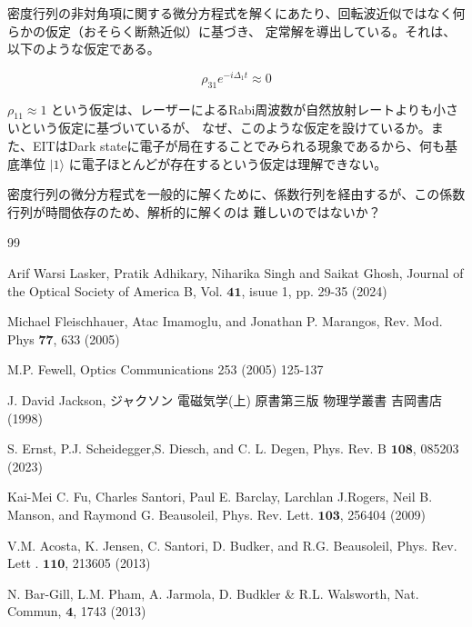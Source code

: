 \documentclass[11pt,a4paper]{ltjsarticle}
\begin{document}
密度行列の非対角項に関する微分方程式を解くにあたり、回転波近似ではなく何らかの仮定（おそらく断熱近似）に基づき、
定常解を導出している。それは、以下のような仮定である。

\begin{equation*}
  \rho_{31} e^{-i \Delta_1 t } \approx 0
\end{equation*}

$\rho_{11} \approx 1$ という仮定は、レーザーによるRabi周波数が自然放射レートよりも小さいという仮定に基づいているが、
なぜ、このような仮定を設けているか。また、EITはDark stateに電子が局在することでみられる現象であるから、何も基底準位 $|1\rangle$
に電子ほとんどが存在するという仮定は理解できない。 

密度行列の微分方程式を一般的に解くために、係数行列を経由するが、この係数行列が時間依存のため、解析的に解くのは
難しいのではないか？



\begin{thebibliography}{99}

Arif Warsi Lasker,
Pratik Adhikary, Niharika Singh and Saikat Ghosh, Journal of the Optical Society of America B, Vol. $\mathbf{41}$, isuue 1, pp. 29-35 (2024)

Michael Fleischhauer, 
Atac Imamoglu, and Jonathan P. Marangos, Rev. Mod. Phys $\mathbf{77}$, 633 (2005)

M.P. Fewell, 
Optics Communications 253 (2005) 125-137


J. David Jackson,
ジャクソン 電磁気学(上) 原書第三版 物理学叢書 吉岡書店 (1998)

S. Ernst,
P.J. Scheidegger,S. Diesch, and C. L. Degen, Phys. Rev. B $\mathbf{108}$, 085203 (2023)

Kai-Mei C. Fu, Charles Santori, Paul E. Barclay, Larchlan J.Rogers, Neil B. Manson, and Raymond G. Beausoleil, 
Phys. Rev. Lett. $\mathbf{103}$, 256404 (2009)

V.M. Acosta, K. Jensen, C. Santori, D. Budker, and R.G. Beausoleil, 
Phys. Rev. Lett . $\mathbf{110}$, 213605 (2013)

N. Bar-Gill, L.M. Pham, A. Jarmola, D. Budkler \& R.L. Walsworth, 
Nat. Commun, $\mathbf{4}$, 1743 (2013)

\end{thebibliography}
\end{document}
